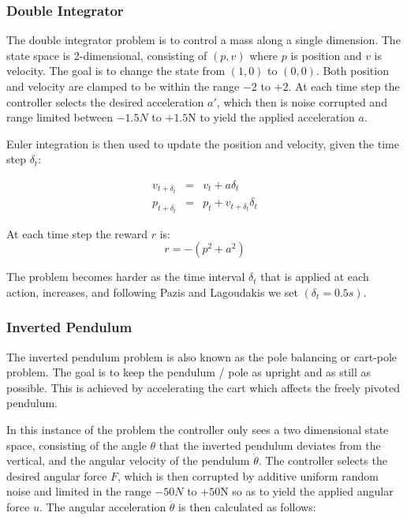 \documentclass[conference]{IEEEtran}
\begin{document}
\subsubsection{Double Integrator}

The double integrator problem is to control a mass along a single dimension.  The state space
is 2-dimensional, consisting of $(p,v)$ where $p$ is position and $v$ is velocity.
The goal is to change the state from $(1,0)$ to $(0,0)$.  Both position and velocity
are clamped to be within the range $-2$ to $+2$.  At each time step the controller selects
the desired acceleration $a'$, which then is noise corrupted and range limited between $-1.5N$ to $+1.5$N to yield the
applied acceleration $a$.

Euler integration is then used to update the position and velocity, given the time step $\delta_t$:

\begin{eqnarray}
v_{t+\delta_t} & = & v_{t} + a \delta_t \\
p_{t+\delta_t} & = & p_{t} + v_{t+\delta_t} \delta_t
\end{eqnarray}

At each time step the reward $r$ is:
\begin{equation}
 r = -(p^2 + a^2)
\end{equation}

The problem becomes harder as the time interval $\delta_t$ that is applied at each action, increases,
and following Pazis and Lagoudakis we set $(\delta_t = 0.5s)$.


\subsubsection{Inverted Pendulum}

The inverted pendulum problem is also known as the pole balancing
or cart-pole problem.  The goal is to keep the pendulum / pole as upright and as still as possible.
This is achieved by accelerating the cart which affects the freely pivoted pendulum.

In this instance of the problem the controller only sees a two dimensional
state space, consisting of the
angle $\theta$ that the inverted pendulum deviates from the vertical, and the angular velocity
of the pendulum $\dot{\theta}$.
The controller selects the desired angular force $F$,
which is then corrupted by additive uniform random noise and limited in the range $-50N$ to $+50$N
so as to yield the applied angular force $u$.  The angular acceleration $\ddot{\theta}$ is then calculated
as follows:
\end{document}
